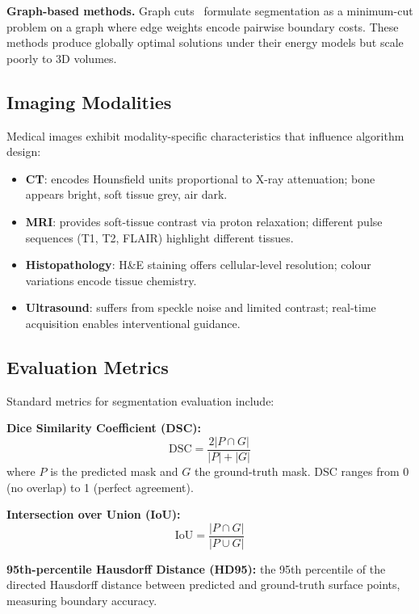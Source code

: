 \documentclass[preprint,12pt,authoryear]{elsarticle}
\begin{document}
\textbf{Graph-based methods.} Graph cuts~\citep{boykov2001graphcuts} formulate
segmentation as a minimum-cut problem on a graph where edge weights encode
pairwise boundary costs. These methods produce globally optimal solutions under
their energy models but scale poorly to 3D volumes.

\subsection{Imaging Modalities}
\label{sec:modalities}

Medical images exhibit modality-specific characteristics that influence
algorithm design:
\begin{itemize}[leftmargin=*, itemsep=1pt]
  \item \textbf{CT}: encodes Hounsfield units proportional to X-ray attenuation;
        bone appears bright, soft tissue grey, air dark.
  \item \textbf{MRI}: provides soft-tissue contrast via proton relaxation;
        different pulse sequences (T1, T2, FLAIR) highlight different tissues.
  \item \textbf{Histopathology}: H\&E staining offers cellular-level resolution;
        colour variations encode tissue chemistry.
  \item \textbf{Ultrasound}: suffers from speckle noise and limited contrast;
        real-time acquisition enables interventional guidance.
\end{itemize}

\subsection{Evaluation Metrics}
\label{sec:metrics}

Standard metrics for segmentation evaluation include:

\textbf{Dice Similarity Coefficient (DSC):}
\begin{equation}
  \mathrm{DSC} = \frac{2|P \cap G|}{|P| + |G|}
\end{equation}
where $P$ is the predicted mask and $G$ the ground-truth mask. DSC ranges from
0 (no overlap) to 1 (perfect agreement).

\textbf{Intersection over Union (IoU):}
\begin{equation}
  \mathrm{IoU} = \frac{|P \cap G|}{|P \cup G|}
\end{equation}

\textbf{95th-percentile Hausdorff Distance (HD95):} the 95th percentile of the
directed Hausdorff distance between predicted and ground-truth surface points,
measuring boundary accuracy.
\end{document}
